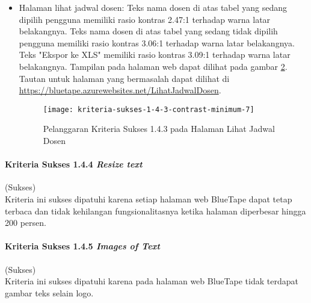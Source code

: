 \begin{itemize}
    \begin{figure}[H]
        \centering  
        \texttt{[image: kriteria-sukses-1-4-3-contrast-minimum-6-2]}  
        \caption[Pelanggaran Kriteria Sukses 1.4.3 pada Kotak Dialog di Halaman Entri Jadwal Dosen]{Pelanggaran Kriteria Sukses 1.4.3 pada Kotak Dialog di Halaman Entri Jadwal Dosen}
        \label{fig:1.4.3_contrast_minimum_6_2}  
    \end{figure} 

    \item Halaman lihat jadwal dosen: Teks nama dosen di atas tabel yang sedang dipilih pengguna memiliki rasio kontras 2.47:1 terhadap warna latar belakangnya. Teks nama dosen di atas tabel yang sedang tidak dipilih pengguna memiliki rasio kontras 3.06:1 terhadap warna latar belakangnya. Teks "Ekspor ke XLS" memiliki rasio kontras 3.09:1 terhadap warna latar belakangnya. Tampilan pada halaman web dapat dilihat pada gambar \ref{fig:1.4.3_contrast_minimum_7}. Tautan untuk halaman yang bermasalah dapat dilihat di \url{https://bluetape.azurewebsites.net/LihatJadwalDosen}.
    \begin{figure}[H]
        \centering  
        \texttt{[image: kriteria-sukses-1-4-3-contrast-minimum-7]}  
        \caption[Pelanggaran Kriteria Sukses 1.4.3 pada Halaman Lihat Jadwal Dosen]{Pelanggaran Kriteria Sukses 1.4.3 pada Halaman Lihat Jadwal Dosen}
        \label{fig:1.4.3_contrast_minimum_7}  
    \end{figure} 
\end{itemize}

\paragraph{Kriteria Sukses 1.4.4 \textit{Resize text}}
\label{par:kepatuhan_bluetape_kriteria_sukses_1.4.4}
(Sukses)\\

Kriteria ini sukses dipatuhi karena setiap halaman web BlueTape dapat tetap terbaca dan tidak kehilangan fungsionalitasnya ketika halaman diperbesar hingga 200 persen. 

\paragraph{Kriteria Sukses 1.4.5 \textit{Images of Text}}
\label{par:kepatuhan_bluetape_kriteria_sukses_1.4.5}
(Sukses)\\

Kriteria ini sukses dipatuhi karena pada halaman web BlueTape tidak terdapat gambar teks selain logo.

